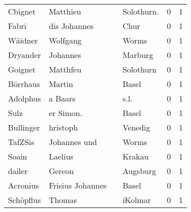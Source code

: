 \begin{center}
\begin{tiny}
\begin{longtabu}{llllrr}
                  Cbignet &                           Matthieu &             &                                 Solothurn.  &          0 &         1 \\
                    Fabri &                       dis Johannes &             &                                        Chur &          0 &         1 \\
                  Wäidner &                           Wolfgang &             &                                       Worms &          0 &         1 \\
                 Dryander &                           Johannes &             &                                     Marburg &          0 &         1 \\
                  Goignet &                           Matthfeu &             &                                   Solothurn &          0 &         1 \\
                 Börrhaus &                             Martin &             &                                       Basel &          0 &         1 \\
                 Adolphus &                            a Baars &             &                                        s.l. &          0 &         1 \\
                     Sulz &                          er Simon. &             &                                       Basel &          0 &         1 \\
                Bullinger &                           hristoph &             &                                     Venedig &          0 &         1 \\
                  TafZSis &                       Johannes und &             &                                       Worms &          0 &         1 \\
                    Soain &                            Laelius &             &                                      Krakau &          0 &         1 \\
                   dailer &                             Gereon &             &                                    Augsburg &          0 &         1 \\
                 Acronius &                   Frisius Johannes &             &                                       Basel &          0 &         1 \\
                Schöpflus &                             Thomas &             &                                     iKolmar &          0 &         1 \\

\end{longtabu}
\end{tiny}
\end{center}
